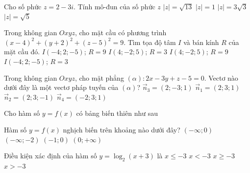 \begin{ex}%
	Cho số phức $z=2-3i$. Tính mô-đun của số phức $z$
	\choice
	{\True $\vert z\vert=\sqrt{13}$}
	{$\vert z\vert=1$}
	{$\vert z\vert=3\sqrt{3}$}
	{$\vert z\vert=\sqrt{5}$}
\end{ex}


\begin{ex}%
	Trong không gian $Oxyz$, cho mặt cầu có phương trình $(x-4)^2+(y+2)^2+(z-5)^2=9$. Tìm tọa độ tâm $I$ và bán kính $R$ của mặt cầu đó.
	\choice
	{$I(-4;2;-5)$; $R=9$}
	{\True $I(4;-2;5)$; $R=3$}
	{$I(4;-2;5)$; $R=9$}
	{$I(-4;2;-5)$; $R=3$}
\end{ex}


\begin{ex}%
	Trong không gian $Oxyz$, cho mặt phẳng $(\alpha) \colon 2x-3y+z-5=0$. Vectơ nào dưới đây là một vectơ pháp tuyến của $(\alpha)$?
	\choice
	{\True $\overrightarrow{n}_3=(2;-3;1)$}
	{$\overrightarrow{n}_1=(2;3;1)$}
	{$\overrightarrow{n}_2=(2;3;-1)$}
	{$\overrightarrow{n}_4=(-2;3;1)$}
\end{ex}


\begin{ex}%
	Cho hàm số $y=f(x)$ có bảng biến thiên như sau
	\begin{center}
	\end{center}
	Hàm số $y=f(x)$ nghịch biến trên khoảng nào dưới đây?
	\choice
	{$(-\infty;0)$}
	{\True $(-\infty;-2)$}
	{$(-1;0)$}
	{$(0;+\infty)$}
\end{ex}


\begin{ex}%
	Điều kiện xác định của hàm số $y=\log _2(x+3)$ là
	\choice
	{$x\leq-3$}
	{$x<-3$}
	{$x\geq-3$}
	{\True $x>-3$}
\end{ex}


